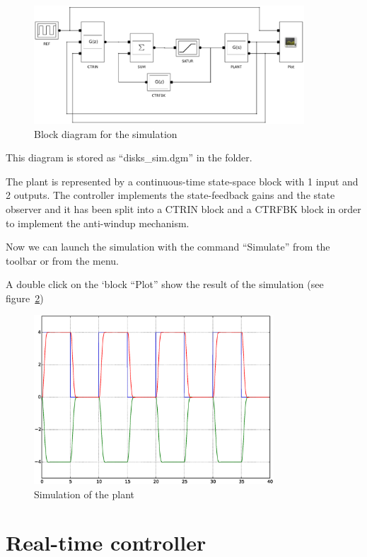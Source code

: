 \begin{figure}[htbp]	%
\centering
\includegraphics[width=0.9\textwidth]{eps/diskssim.eps}
\caption{Block diagram for the simulation}
\label{F21}
\end{figure}

This diagram is stored as ``disks\_sim.dgm'' in the folder.

The plant is represented by a continuous-time state-space block with 1 input 
and 2 outputs.
The controller implements the state-feedback gains and the state observer 
and it has been split into a CTRIN block and a CTRFBK block in order to 
implement the anti-windup mechanism.

Now we can launch the simulation with the command ``Simulate'' from the toolbar 
or from the menu.

A double click on the `block ``Plot'' show the result of the simulation (see 
figure~\ref{F22})

\begin{figure}[htbp]	%
\centering
\includegraphics[width=0.8\textwidth]{eps/simout.eps}
\caption{Simulation of the plant}
\label{F22}
\end{figure}

\section{Real-time controller}

